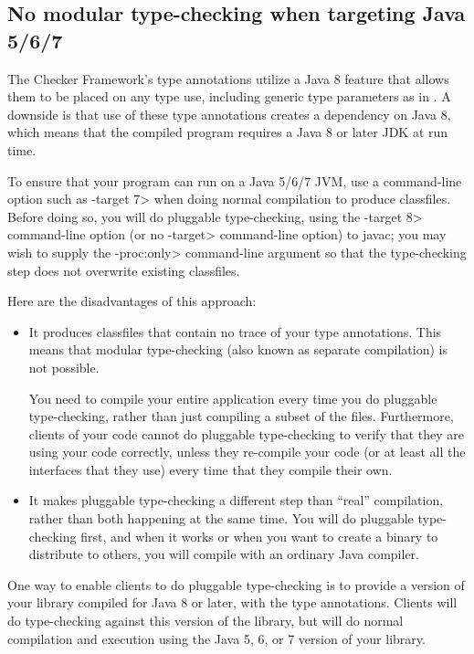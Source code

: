 \subsection{No modular type-checking when targeting Java 5/6/7\label{no-modular-type-checking-java7-jvm}}

The Checker Framework's type annotations utilize a Java 8 feature that
allows them to be placed on any type use, including generic type parameters
as in .  A downside is that use of these type
annotations creates a dependency on Java 8, which means that the compiled
program requires a Java 8 or later JDK at run time.

To ensure that your program can run on a Java 5/6/7 JVM, use a command-line
option such as \<-target 7> when doing normal compilation to produce
classfiles.  Before doing so, you will do pluggable type-checking, using the
\<-target 8> command-line option (or no \<-target> command-line option) to
javac; you may wish to supply the \<-proc:only> command-line argument so
that the type-checking step does not overwrite existing classfiles.

Here are the disadvantages of this approach:

\begin{itemize}
\item
It produces classfiles that contain no trace of your type annotations.
This means that modular type-checking (also known as separate compilation)
is not possible.

You need to compile your entire application every time you
do pluggable type-checking, rather than just compiling a subset of the
files.  Furthermore, clients of your code cannot do pluggable
type-checking to verify that they are using your code correctly, unless
they re-compile your code (or at least all the interfaces that they use)
every time that they compile their own.

\item
It makes pluggable type-checking a
different step than ``real'' compilation, rather than both happening at the
same time.  You will do pluggable type-checking first, and when it works or
when you want to create a binary to distribute to others, you will compile
with an ordinary Java compiler.
\end{itemize}

One way to enable clients to do pluggable type-checking is to provide a
version of your library compiled for Java 8 or later, with the type
annotations.  Clients will do type-checking against this version of the
library, but will do normal compilation and execution using the Java 5, 6,
or 7 version of your library.

